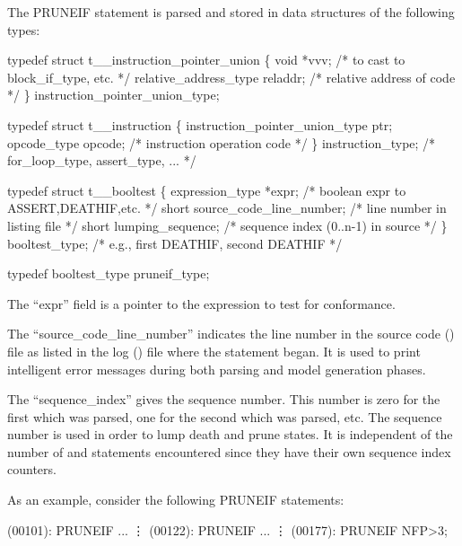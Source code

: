 The PRUNEIF statement is parsed
and stored in data structures of the following types:
\begin{codeexample}
typedef struct t__instruction_pointer_union
   \{
       void *vvv;                      /* to cast to block_if_type, etc. */
       relative_address_type reladdr;  /* relative address of code */
   \} instruction_pointer_union_type;
\end{codeexample}

\begin{codeexample}
typedef struct t__instruction
   \{
       instruction_pointer_union_type ptr;
       opcode_type opcode;      /* instruction operation code */
   \} instruction_type;          /*    for_loop_type, assert_type, ... */
\end{codeexample}

\begin{codeexample}
typedef struct t__booltest
   \{
       expression_type *expr;         /* boolean expr to ASSERT,DEATHIF,etc. */
       short source_code_line_number; /* line number in listing file */
       short lumping_sequence;        /* sequence index (0..n-1) in source */
   \} booltest_type;                   /* e.g., first DEATHIF, second DEATHIF */
\end{codeexample}

\begin{codeexample}
typedef booltest_type pruneif_type;
\end{codeexample}


The ``expr'' field is a pointer to the expression to test for conformance.

The ``source\_code\_line\_number'' indicates the line number in the source
code () file as listed in the log () file
where the statement began.   It is used to print intelligent
error messages during both parsing and model generation phases.

The ``sequence\_index'' gives the  sequence number.   This number
is zero for the first  which was parsed, one for the second
 which was parsed, etc.   The sequence number is used in order
to lump death and prune states.  It is independent of the number of 
and  statements encountered since they have their own sequence
index counters.

As an example, consider the following PRUNEIF statements:
\begin{logfileexample}
(00101): PRUNEIF  ...
         \vdots
(00122): PRUNEIF  ...
         \vdots
(00177): PRUNEIF NFP>3;
\end{logfileexample}

